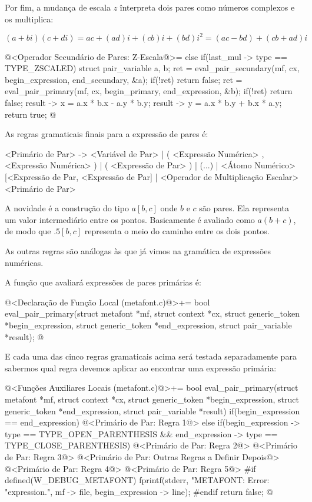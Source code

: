 Por fim, a mudança de escala $z$ înterpreta dois pares como números
complexos e os multiplica:

$$
(a+bi)(c+di) = ac + (ad)i + (cb)i + (bd)i^2 = (ac - bd) + (cb+ad)i
$$

\iniciocodigo
@<Operador Secundário de Pares: Z-Escala@>=
else if(last_mul -> type == TYPE_ZSCALED){
  struct pair_variable a, b;
  ret = eval_pair_secundary(mf, cx, begin_expression, end_secundary, &a);
  if(!ret)
    return false;
  ret = eval_pair_primary(mf, cx, begin_primary, end_expression, &b);
  if(!ret)
    return false;
  result -> x = a.x * b.x - a.y * b.y;
  result -> y = a.x * b.y + b.x * a.y;
  return true;
}
@
\fimcodigo


As regras gramaticais finais para a expressão de pares é:

\alinhaverbatim
<Primário de Par> -> <Variável de Par> |
                     ( <Expressão Numérica> , <Expressão Numérica> ) |
                     ( <Expressão de Par> ) |
                     (...) |
                     <Átomo Numérico>[<Expressão de Par,
                                      <Expressão de Par]  |
                     <Operador de Multiplicação Escalar><Primário de Par>
\alinhanormal

A novidade é a construção do tipo $a[b, c]$ onde $b$ e $c$ são
pares. Ela representa um valor intermediário entre os
pontos. Basicamente é avaliado como $a(b+c)$, de modo que $.5[b,c]$
representa o meio do caminho entre os dois pontos.

As outras regras são análogas às que já vimos na gramática de
expressões numéricas.

A função que avaliará expressões de pares primárias é:

\iniciocodigo
@<Declaração de Função Local (metafont.c)@>+=
bool eval_pair_primary(struct metafont *mf, struct context *cx,
                       struct generic_token *begin_expression,
                       struct generic_token *end_expression,
                       struct pair_variable *result);
@
\fimcodigo

E cada uma das cinco regras gramaticais acima será testada
separadamente para sabermos qual regra devemos aplicar ao encontrar
uma expressão primária:

\iniciocodigo
@<Funções Auxiliares Locais (metafont.c)@>+=
bool eval_pair_primary(struct metafont *mf, struct context *cx,
                       struct generic_token *begin_expression,
                       struct generic_token *end_expression,
                       struct pair_variable *result){
  if(begin_expression == end_expression){
    @<Primário de Par: Regra 1@>
  }
  else if(begin_expression -> type == TYPE_OPEN_PARENTHESIS &&
          end_expression -> type == TYPE_CLOSE_PARENTHESIS){
    @<Primário de Par: Regra 2@>
    @<Primário de Par: Regra 3@>
  }
  @<Primário de Par: Outras Regras a Definir Depois@>
  @<Primário de Par: Regra 4@>
  @<Primário de Par: Regra 5@>
#if defined(W_DEBUG_METAFONT)
  fprintf(stderr, "METAFONT: Error: %
          "expression.\n",  mf -> file, begin_expression -> line);
#endif
  return false;
}
@

